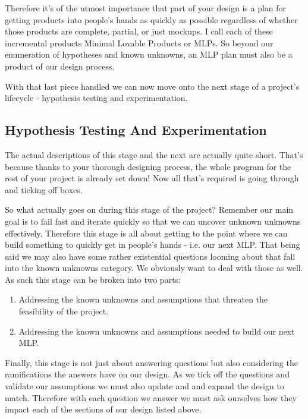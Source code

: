\documentclass[10pt,a5paper]{book}
\begin{document}
Therefore it's of the utmost importance that part of your design is a plan for getting products into people's hands as quickly as possible regardless of whether those products are complete, partial, or just mockups. I call each of these incremental products Minimal Lovable Products or MLPs. So beyond our enumeration of hypotheses and known unknowns, an MLP plan must also be a product of our design process.

With that last piece handled we can now move onto the next stage of a project's lifecycle - hypothesis testing and experimentation.

\subsection{Hypothesis Testing And Experimentation}
The actual descriptions of this stage and the next are actually quite short. That's because thanks to your thorough designing process, the whole program for the rest of your project is already set down! Now all that's required is going through and ticking off boxes. 

So what actually goes on during this stage of the project? Remember our main goal is to fail fast and iterate quickly so that we can uncover unknown unknowns effectively. Therefore this stage is all about getting to the point where we can build something to quickly get in people's hands - i.e. our next MLP. That being said we may also have some rather existential questions looming about that fall into the known unknowns category. We obviously want to deal with those as well. As such this stage can be broken into two parts:
\begin{enumerate}
\item Addressing the known unknowns and assumptions that threaten the feasibility of the project.
\item Addressing the known unknowns and assumptions needed to build our next MLP.
\end{enumerate}

Finally, this stage is not just about answering questions but also considering the ramifications the answers have on our design. As we tick off the questions and validate our assumptions we must also update and and expand the design to match. Therefore with each question we answer we must ask ourselves how they impact each of the sections of our design listed above. 
\end{document}
